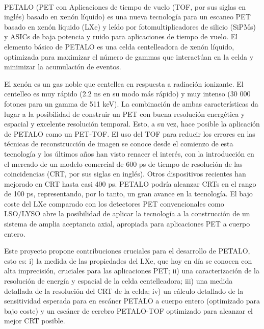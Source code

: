 \\
PETALO (PET con Aplicaciones de tiempo de vuelo (TOF, por sus siglas en ingl\'es) basado en xen\'on l\'iquido) es una nueva tecnolog\'ia para un escaneo PET basado en xen\'on l\'iquido (LXe) y le\'ido por fotomultiplicadores de silicio (SiPMs) y ASICs de baja potencia y ruido para aplicaciones de tiempo de vuelo. El elemento b\'asico de PETALO es una celda centelleadora de xen\'on l\'iquido, optimizada para maximizar el n\'umero de gammas que interact\'uan en la celda y minimizar la acumulaci\'on de eventos.

El xen\'on es un gas noble que centellea en respuesta a radiaci\'on ionizante. El centelleo es muy r\'apido (2.2 ns en su modo m\'as r\'apido) y muy intenso (30 000 fotones para un gamma de 511 keV). La combinaci\'on de ambas caracter\'isticas da lugar a la posibilidad de construir un PET con buena resoluci\'on energ\'etica y espacial y excelente resoluci\'on temporal. Esto, a su vez, hace posible la aplicaci\'on de PETALO como un PET-TOF. El uso del TOF para reducir los errores en las t\'ecnicas de reconstrucci\'on de imagen se conoce desde el comienzo de esta tecnolog\'ia y los \'ultimos a\~nos han visto renacer el inter\'es, con la introducci\'on en el mercado de un modelo comercial de 600 ps de tiempo de resoluci\'on de las coincidencias (CRT, por sus siglas en ingl\'es). Otros dispositivos recientes han mejorado en CRT hasta casi 400 ps. PETALO podr\'ia alcanzar CRTs en el rango de 100 ps, representando, por lo tanto, un gran avance en la tecnolog\'ia. El bajo coste del LXe comparado con los detectores PET convencionales como LSO/LYSO abre la posibilidad de aplicar la tecnolog\'ia a la construcci\'on de un sistema de amplia aceptancia axial, apropiada para aplicaciones PET a cuerpo entero.

Este proyecto propone contribuciones cruciales para el desarrollo de PETALO, esto es: i) la medida de las propiedades del LXe, que hoy en d\'ia se conocen con alta imprecisi\'on, cruciales para las aplicaciones PET; ii) una caracterizaci\'on de la resoluci\'on de energ\'ia y espacial de la celda centelleadora; iii) una medida detallada de la resoluci\'on del CRT de la celda; iv) un c\'alculo detallado de la sensitividad esperada para en esc\'aner PETALO a cuerpo entero (optimizado para bajo coste) y un esc\'aner de cerebro PETALO-TOF optimizado para alcanzar el mejor CRT posible.

